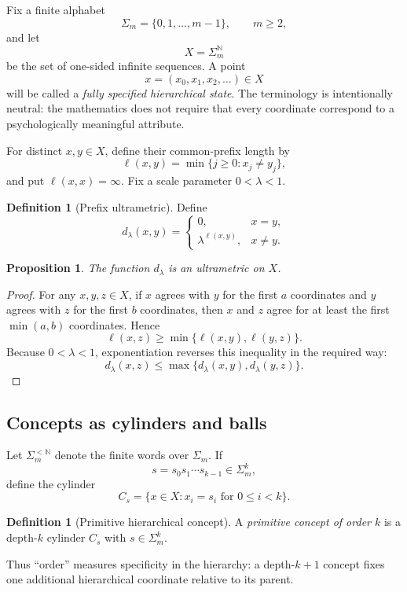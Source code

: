 \documentclass[11pt]{article}
\newtheorem{proposition}[theorem]{Proposition}
\theoremstyle{definition}
\newtheorem{definition}[theorem]{Definition}
\theoremstyle{remark}
\newcommand{\N}{\mathbb N}
\newcommand{\cyl}[1]{C_{#1}}
\begin{document}
Fix a finite alphabet
\[
\Sigma_m=\{0,1,\ldots,m-1\},\qquad m\ge 2,
\]
and let
\[
X=\Sigma_m^{\N}
\]
be the set of one-sided infinite sequences.  A point
\[
x=(x_0,x_1,x_2,\ldots)\in X
\]
will be called a \emph{fully specified hierarchical state}.  The terminology is intentionally neutral: the mathematics does not require that every coordinate correspond to a psychologically meaningful attribute.

For distinct $x,y\in X$, define their common-prefix length by
\[
\ell(x,y)=\min\{j\ge 0:x_j\ne y_j\},
\]
and put $\ell(x,x)=\infty$.  Fix a scale parameter $0<\lambda<1$.

\begin{definition}[Prefix ultrametric]
Define
\[
d_\lambda(x,y)=
\begin{cases}
0,&x=y,\\
\lambda^{\ell(x,y)},&x\ne y.
\end{cases}
\]
\end{definition}

\begin{proposition}\label{prop:ultrametric}
The function $d_\lambda$ is an ultrametric on $X$.
\end{proposition}

\begin{proof}
For any $x,y,z\in X$, if $x$ agrees with $y$ for the first $a$ coordinates and $y$ agrees with $z$ for the first $b$ coordinates, then $x$ and $z$ agree for at least the first $\min(a,b)$ coordinates.  Hence
\[
\ell(x,z)\ge \min\{\ell(x,y),\ell(y,z)\}.
\]
Because $0<\lambda<1$, exponentiation reverses this inequality in the required way:
\[
d_\lambda(x,z)
\le \max\{d_\lambda(x,y),d_\lambda(y,z)\}.
\]
\end{proof}

\subsection{Concepts as cylinders and balls}

Let $\Sigma_m^{<\N}$ denote the finite words over $\Sigma_m$.  If
\[
s=s_0s_1\cdots s_{k-1}\in\Sigma_m^k,
\]
define the cylinder
\[
\cyl{s}=\{x\in X:x_i=s_i\text{ for }0\le i<k\}.
\]

\begin{definition}[Primitive hierarchical concept]
A \emph{primitive concept of order $k$} is a depth-$k$ cylinder $\cyl{s}$ with $s\in\Sigma_m^k$.
\end{definition}

Thus ``order'' measures specificity in the hierarchy: a depth-$k+1$ concept fixes one additional hierarchical coordinate relative to its parent.
\end{document}
